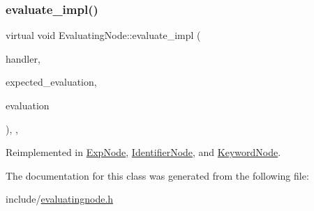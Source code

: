 \subsubsection{\texorpdfstring{evaluate\+\_\+impl()}{evaluate\_impl()}}
{\footnotesize\ttfamily virtual void Evaluating\+Node\+::evaluate\+\_\+impl (\begin{DoxyParamCaption}\item[{\hyperlink{classSystemHandler}{System\+Handler} $\ast$}]{handler,  }\item[{\hyperlink{statics_8h_a6664c451ca7787483a7981cc1de68dbb}{E\+V\+A\+L\+U\+A\+T\+I\+O\+N\+\_\+\+T\+Y\+PE}}]{expected\+\_\+evaluation,  }\item[{struct \hyperlink{structEvaluation}{Evaluation} $\ast$}]{evaluation }\end{DoxyParamCaption})\hspace{0.3cm}{\ttfamily [inline]}, {\ttfamily [protected]}, {\ttfamily [virtual]}}



Reimplemented in \hyperlink{classExpNode_a58c05ac75051f109512ce8fa5ceb68c7}{Exp\+Node}, \hyperlink{classIdentifierNode_a4960a1e68623066e413f8c2d68cee7e5}{Identifier\+Node}, and \hyperlink{classKeywordNode_a699f7171c8415901b1a501f72933cfdf}{Keyword\+Node}.



The documentation for this class was generated from the following file\+:\begin{DoxyCompactItemize}
\item 
include/\hyperlink{evaluatingnode_8h}{evaluatingnode.\+h}\end{DoxyCompactItemize}
